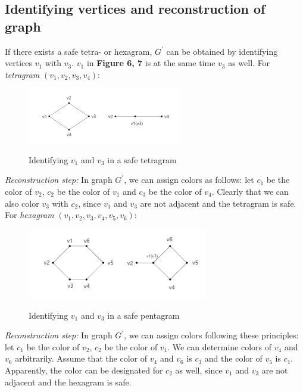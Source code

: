 \subsection{Identifying vertices and reconstruction of graph}

If there exists a safe tetra- or hexagram, $G^{'}$ can be obtained by identifying vertices $v_1$ with $v_3$. $v_1$ in \textbf{Figure 6, 7} is at the same time $v_3$ as well. For \textit{tetragram} $(v_1, v_2, v_3, v_4)$:
\begin{figure}[H] %
\centering %
\includegraphics[width=0.6\textwidth]{figure/identifyingv1v3.png} 
\label{figure} %
\caption{Identifying $v_1$ and $v_3$ in a safe tetragram}
\end{figure}

\textit{Reconstruction step: }In graph $G^{'}$, we can assign colors as follows: let $c_1$ be the color of $v_2$, $c_2$ be the color of $v_1$ and $c_3$ be the color of $v_4$. Clearly that we can also color $v_3$ with $c_2$, since $v_1$ and $v_3$ are not adjacent and the tetragram is safe.\\

For \textit{hexagram} $(v_1, v_2, v_3, v_4, v_5, v_6)$: 
\begin{figure}[H] %
\centering %
\includegraphics[width=0.7\textwidth]{figure/identifyingv1v32.png} 
\label{figure} %
\caption{Identifying $v_1$ and $v_3$ in a safe pentagram}
\end{figure}

\textit{Reconstruction step: }In graph $G^{'}$, we can assign colors following these principles: let $c_1$ be the color of $v_2$, $c_2$ be the color of $v_1$. We can determine colors of $v_4$ and $v_6$ arbitrarily. Assume that the color of $v_4$ and $v_6$ is $c_3$ and the color of $v_5$ is $c_1$. Apparently, the color can be designated for $c_2$ as well, since $v_1$ and $v_3$ are not adjacent and the hexagram is safe.\\

